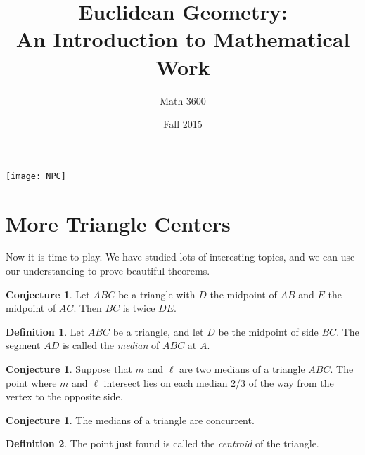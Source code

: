 \documentclass{tufte-handout}
\title{Euclidean Geometry:\\An Introduction to Mathematical Work}
\author[]{Math 3600}
\date{Fall 2015}
\theoremstyle{definition}
\newtheorem{conjecture}[problem]{Conjecture}
\newtheorem*{definition}{Definition}
\newtheorem{challenge}[problem]{Challenge}
\begin{document}
\maketitle

\begin{marginfigure}
    \texttt{[image: NPC]}
\end{marginfigure}

\setcounter{section}{17}
\section{More Triangle Centers}

Now it is time to play. We have studied lots of interesting topics, and we can use our understanding to prove beautiful theorems.

\begin{conjecture} Let $ABC$ be a triangle with $D$ the midpoint of $AB$ and $E$ the midpoint of $AC$. Then $BC$ is twice $DE$.
\end{conjecture}

\begin{definition}\label{defn:median}
Let $ABC$ be a triangle, and let $D$ be the midpoint of side $BC$. The segment $AD$ is called the \emph{median} of $ABC$ at $A$.
\end{definition}

\begin{conjecture}\label{conj:location-median}
Suppose that $m$ and $\ell $ are two medians of a triangle $ABC$.  The point where $m$ and $\ell$ intersect lies on each median $2/3$ of the way from the vertex to the opposite side.
\end{conjecture}

\begin{conjecture}\label{conj:medians-concurrent}
The medians of a triangle are concurrent.
\end{conjecture}

\begin{definition}\label{defn:centroid}
The point just found is called the \emph{centroid} of the triangle.
\end{definition}

%
\end{document}
